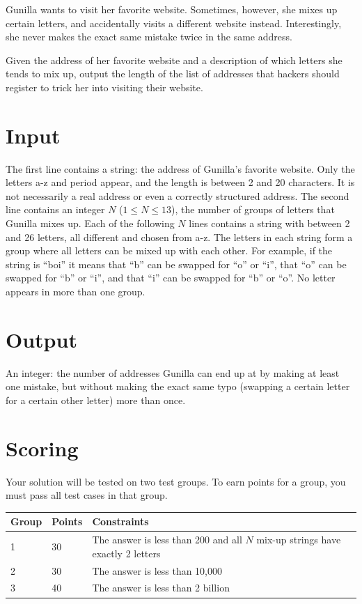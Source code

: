 
Gunilla wants to visit her favorite website. Sometimes, however, she mixes up certain letters, and accidentally visits a different website instead. Interestingly, she never makes the exact same mistake twice in the same address.

Given the address of her favorite website and a description of which letters she tends to mix up, output the length of the list of addresses that hackers should register to trick her into visiting their website.

\section*{Input}

The first line contains a string: the address of Gunilla's favorite website. Only the letters a-z and period appear, and the length is between 2 and 20 characters. It is not necessarily a real address or even a correctly structured address. The second line contains an integer $N$ ($1 \le N \le 13$), the number of groups of letters that Gunilla mixes up. Each of the following $N$ lines contains a string with between 2 and 26 letters, all different and chosen from a-z. The letters in each string form a group where all letters can be mixed up with each other. For example, if the string is ``boi'' it means that ``b'' can be swapped for ``o'' or ``i'', that ``o'' can be swapped for ``b'' or ``i'', and that ``i'' can be swapped for ``b'' or ``o''. No letter appears in more than one group.

\section*{Output}

An integer: the number of addresses Gunilla can end up at by making at least one mistake, but without making the exact same typo (swapping a certain letter for a certain other letter) more than once.

\section*{Scoring}
Your solution will be tested on two test groups. To earn points for a group,
you must pass all test cases in that group.

\begin{tabular}{| l | l | l |}
\hline
Group & Points & Constraints \\ \hline
1     & 30         & The answer is less than 200 and all $N$ mix-up strings have exactly 2 letters \\
2     & 30         & The answer is less than 10,000 \\ 
3     & 40         & The answer is less than 2 billion \\ \hline
\end{tabular}


